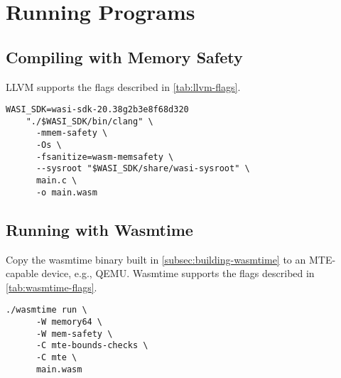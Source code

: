 \section{Running Programs}
\label{sec:running-programs}

\subsection{Compiling with Memory Safety}\label{subsec:compiling-with-memory-safety}

LLVM supports the flags described in \cref{tab:llvm-flags}.

\begin{lstlisting}[label={lst:compiling-to-wasm}]
    WASI_SDK=wasi-sdk-20.38g2b3e8f68d320
    "./$WASI_SDK/bin/clang" \
      -mmem-safety \
      -Os \
      -fsanitize=wasm-memsafety \
      --sysroot "$WASI_SDK/share/wasi-sysroot" \
      main.c \
      -o main.wasm
\end{lstlisting}

\subsection{Running with Wasmtime}\label{subsec:running-with-wasmtime}

Copy the wasmtime binary built in \cref{subsec:building-wasmtime} to an \ac{MTE}-capable device, e.g., QEMU.
Wasmtime supports the flags described in \cref{tab:wasmtime-flags}.

\begin{lstlisting}[label={lst:running-wasm}]
    ./wasmtime run \
      -W memory64 \
      -W mem-safety \
      -C mte-bounds-checks \
      -C mte \
      main.wasm
\end{lstlisting}
